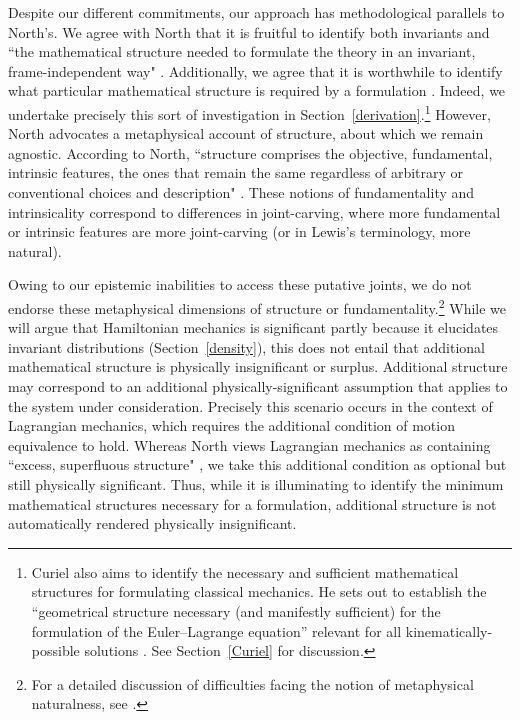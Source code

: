 \documentclass[letterpaper]{article}
\begin{document}
Despite our different commitments, our approach has methodological parallels to North's. We agree with North that it is fruitful to identify both invariants and ``the mathematical structure needed to formulate the theory in an invariant, frame-independent way" \parencites*[65]{North}. Additionally, we agree that it is worthwhile to identify what particular mathematical structure is required by a formulation \parencites[78]{North}. Indeed, we undertake precisely this sort of investigation in Section~\ref{derivation}.\footnote{Curiel also aims to identify the necessary and sufficient mathematical structures for formulating classical mechanics. He sets out to establish the ``geometrical structure necessary (and manifestly sufficient) for the formulation of the Euler--Lagrange equation'' relevant for all kinematically-possible solutions \parencites*[292]{Curiel}. See Section~\ref{Curiel} for discussion.} However, North advocates a metaphysical account of structure, about which we remain agnostic. According to North, ``structure comprises the objective, fundamental, intrinsic features, the ones that remain the same regardless of arbitrary or conventional choices and description" \parencites*[66]{North}. These notions of fundamentality and intrinsicality correspond to differences in joint-carving, where more fundamental or intrinsic features are more joint-carving (or in Lewis's \parencites*[]{Lewis1983} terminology, more natural). 

Owing to our epistemic inabilities to access these putative joints, we do not endorse these metaphysical dimensions of structure or fundamentality.\footnote{For a detailed discussion of difficulties facing the notion of metaphysical naturalness, see \textcites[]{Dorr_Hawthorne}.} While we will argue that Hamiltonian mechanics is significant partly because it elucidates invariant distributions (Section~\ref{density}), this does not entail that additional mathematical structure is physically insignificant or surplus. Additional structure may correspond to an additional physically-significant assumption that applies to the system under consideration. Precisely this scenario occurs in the context of Lagrangian mechanics, which requires the additional condition of motion equivalence to hold. Whereas North views Lagrangian mechanics as containing ``excess, superfluous structure" \parencites*[75]{North}, we take this additional condition as optional but still physically significant. Thus, while it is illuminating to identify the minimum mathematical structures necessary for a formulation, additional structure is not automatically rendered physically insignificant. %
\end{document}
